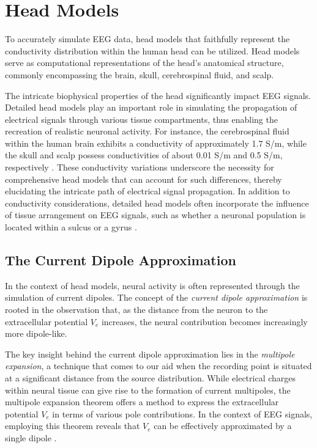 \documentclass[a4paper, UKenglish, 11pt]{uiomaster}
\begin{document}
\section{Head Models}
To accurately simulate EEG data, head models that faithfully represent the conductivity distribution within the human head can be utilized. Head models serve as computational representations of the head's anatomical structure, commonly encompassing the brain, skull, cerebrospinal fluid, and scalp.

The intricate biophysical properties of the head significantly impact EEG signals. Detailed head models play an important role in simulating the propagation of electrical signals through various tissue compartments, thus enabling the recreation of realistic neuronal activity.
For instance, the cerebrospinal fluid within the human brain exhibits a conductivity of approximately 1.7 S/m, while the skull and scalp possess conductivities of about 0.01 S/m and 0.5 S/m, respectively \cite{naess2021biophysically}.
These conductivity variations underscore the necessity for comprehensive head models that can account for such differences, thereby elucidating the intricate path of electrical signal propagation. In addition to conductivity considerations, detailed head models often incorporate the influence of tissue arrangement on EEG signals, such as whether a neuronal population is located within a sulcus or a gyrus \cite{naess2021biophysically}.


\subsection{The Current Dipole Approximation}
In the context of head models, neural activity is often represented through the simulation of current dipoles. The concept of the \emph{current dipole approximation} is rooted in the observation that, as the distance from the neuron to the extracellular potential $V_e$ increases, the neural contribution becomes increasingly more dipole-like.

The key insight behind the current dipole approximation lies in the \emph{multipole expansion}, a technique that comes to our aid when the recording point is situated at a significant distance from the source distribution. While electrical charges within neural tissue can give rise to the formation of current multipoles, the multipole expansion theorem offers a method to express the extracellular potential $V_e$ in terms of various pole contributions. In the context of EEG signals, employing this theorem reveals that $V_e$ can be effectively approximated by a single dipole \cite{brainmodel2022}.
\end{document}
